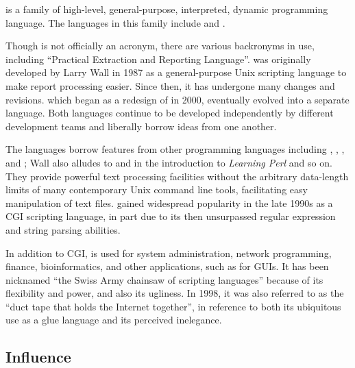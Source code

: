 \documentclass[../Languages.tex]{subfiles}
\begin{document}
\label{sec:perl}

 is a family of high-level, general-purpose, interpreted, dynamic
programming language. The languages in this family include  and
.

Though  is not officially an acronym, there are various backronyms in
use, including ``Practical Extraction and Reporting Language''.  was
originally developed by Larry Wall in 1987 as a general-purpose Unix scripting
language to make report processing easier. Since then, it has undergone many
changes and revisions.  which began as a redesign of  in
2000, eventually evolved into a separate language. Both languages continue to
be developed independently by different development teams and liberally borrow
ideas from one another.

The  languages borrow features from other programming languages
including , , , and ; Wall also alludes to
 and  in the introduction to \textit{Learning Perl} and so
on. They provide powerful text processing facilities without the arbitrary
data-length limits of many contemporary Unix command line tools, facilitating
easy manipulation of text files.  gained widespread popularity in
the late 1990s as a CGI scripting language, in part due to its then unsurpassed
regular expression and string parsing abilities.

In addition to CGI,  is used for system administration, network
programming, finance, bioinformatics, and other applications, such as for
GUIs. It has been nicknamed ``the Swiss Army chainsaw of scripting languages''
because of its flexibility and power, and also its ugliness. In 1998, it was
also referred to as the ``duct tape that holds the Internet together'', in
reference to both its ubiquitous use as a glue language and its perceived
inelegance.

\subsection{Influence}\label{sub:influence}
\end{document}
